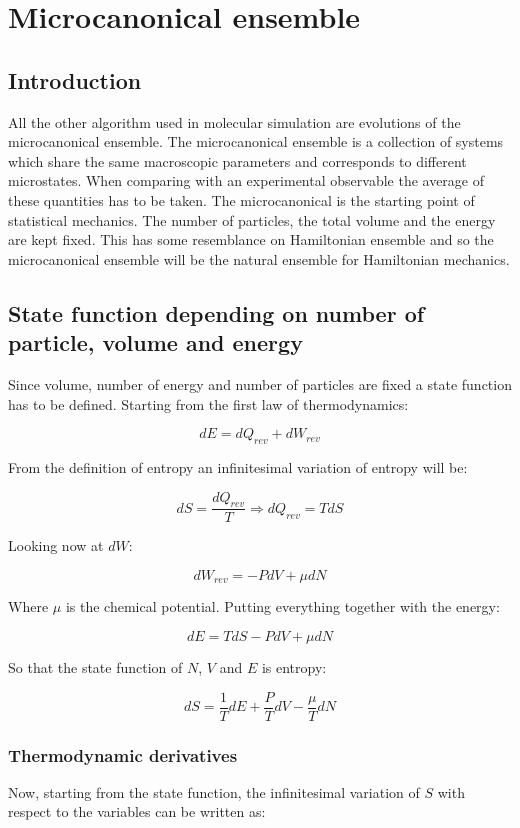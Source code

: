 \chapter{Microcanonical ensemble}

\section{Introduction}
All the other algorithm used in molecular simulation are evolutions of the microcanonical ensemble.
The microcanonical ensemble is a collection of systems which share the same macroscopic parameters and corresponds to different microstates.
When comparing with an experimental observable the average of these quantities has to be taken.
The microcanonical is the starting point of statistical mechanics.
The number of particles, the total volume and the energy are kept fixed.
This has some resemblance on Hamiltonian ensemble and so the microcanonical ensemble will be the natural ensemble for Hamiltonian mechanics.

\section{State function depending on number of particle, volume and energy}
Since volume, number of energy and number of particles are fixed a state function has to be defined.
Starting from the first law of thermodynamics:

$$dE = dQ_{rev} + dW_{rev}$$

From the definition of entropy an infinitesimal variation of entropy will be:

$$dS = \frac{dQ_{rev}}{T}\Rightarrow dQ_{rev} = TdS$$

Looking now at $dW$:

$$dW_{rev} = -PdV + \mu dN$$

Where $\mu$ is the chemical potential.
Putting everything together with the energy:

$$dE = TdS - PdV + \mu dN$$

So that the state function of $N$, $V$ and $E$ is entropy:

$$dS = \frac{1}{T}dE + \frac{P}{T}dV - \frac{\mu}{T}dN$$

	\subsection{Thermodynamic derivatives}
	Now, starting from the state function, the infinitesimal variation of $S$ with respect to the variables can be written as:

